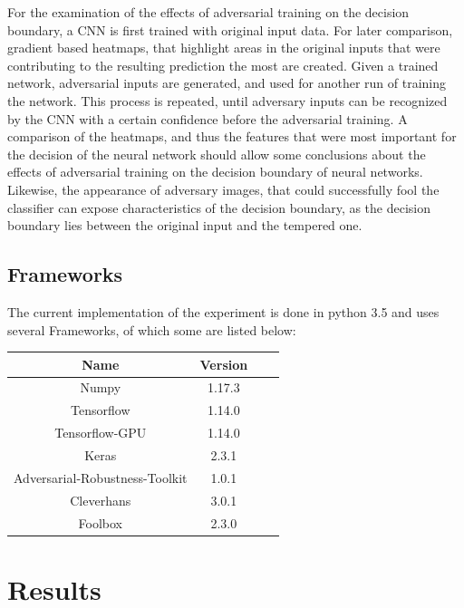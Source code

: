 \documentclass[draft,final]{vutinfth} %
\begin{document}
For the examination of the effects of adversarial training on the decision boundary, a CNN is first trained with original input data. For later comparison, gradient based heatmaps, that highlight areas in the original inputs
that were contributing to the resulting prediction the most are created. Given a trained network, adversarial inputs are generated, and used for another run of training the network. This process is repeated, until adversary
inputs can be recognized by the CNN with a certain confidence before the adversarial training. 
A comparison of the heatmaps, and thus the features that were most important for the decision of the neural network should allow some conclusions about the effects of adversarial training on the decision boundary of neural networks. Likewise,
the appearance of adversary images, that could successfully fool the classifier can expose characteristics of the decision boundary, as the decision boundary lies between the original input and the tempered one.

\section{Frameworks}

The current implementation of the experiment is done in python 3.5 and uses several Frameworks, of which some are listed below:

\begin{table}[h]
  \centering
  \begin{tabular}{cccc}
    \toprule
Name                                    & Version   \\
    \midrule
    Numpy                               & 1.17.3    \\
    Tensorflow                          & 1.14.0    \\
    Tensorflow-GPU                      & 1.14.0    \\
    Keras                               & 2.3.1     \\
    Adversarial-Robustness-Toolkit      & 1.0.1     \\
    Cleverhans                          & 3.0.1     \\
    Foolbox                             & 2.3.0     \\
    
    \bottomrule
  \end{tabular}
\end{table}

\chapter{Results}
\end{document}
